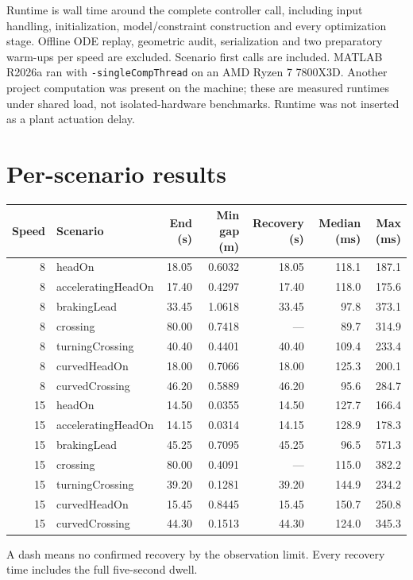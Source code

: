 \documentclass[11pt]{article}
\begin{document}
Runtime is wall time around the complete controller call, including input
handling, initialization, model/constraint construction and every optimization
stage. Offline ODE replay, geometric audit, serialization and two preparatory
warm-ups per speed are excluded. Scenario first calls are included. MATLAB
R2026a ran with \texttt{-singleCompThread} on an AMD Ryzen 7 7800X3D. Another
project computation was present on the machine; these are measured runtimes
under shared load, not isolated-hardware benchmarks. Runtime was not inserted
as a plant actuation delay.

\section{Per-scenario results}
\begin{center}\small
\begin{tabular}{rlrrrrr}
\toprule
Speed & Scenario & End (s) & Min gap (m) & Recovery (s) & Median (ms) & Max (ms)\\
\midrule
8 & headOn & 18.05 & 0.6032 & 18.05 & 118.1 & 187.1 \\
8 & acceleratingHeadOn & 17.40 & 0.4297 & 17.40 & 118.0 & 175.6 \\
8 & brakingLead & 33.45 & 1.0618 & 33.45 & 97.8 & 373.1 \\
8 & crossing & 80.00 & 0.7418 & --- & 89.7 & 314.9 \\
8 & turningCrossing & 40.40 & 0.4401 & 40.40 & 109.4 & 233.4 \\
8 & curvedHeadOn & 18.00 & 0.7066 & 18.00 & 125.3 & 200.1 \\
8 & curvedCrossing & 46.20 & 0.5889 & 46.20 & 95.6 & 284.7 \\
15 & headOn & 14.50 & 0.0355 & 14.50 & 127.7 & 166.4 \\
15 & acceleratingHeadOn & 14.15 & 0.0314 & 14.15 & 128.9 & 178.3 \\
15 & brakingLead & 45.25 & 0.7095 & 45.25 & 96.5 & 571.3 \\
15 & crossing & 80.00 & 0.4091 & --- & 115.0 & 382.2 \\
15 & turningCrossing & 39.20 & 0.1281 & 39.20 & 144.9 & 234.2 \\
15 & curvedHeadOn & 15.45 & 0.8445 & 15.45 & 150.7 & 250.8 \\
15 & curvedCrossing & 44.30 & 0.1513 & 44.30 & 124.0 & 345.3 \\
\bottomrule
\end{tabular}
\end{center}
A dash means no confirmed recovery by the observation limit. Every recovery
time includes the full five-second dwell.
\end{document}

